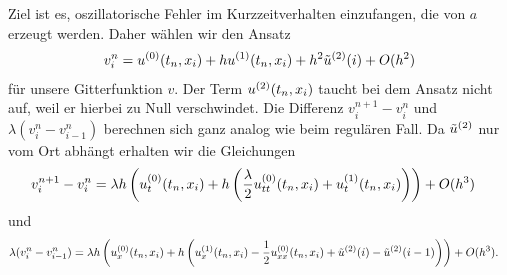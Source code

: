Ziel ist es, oszillatorische Fehler im Kurzzeitverhalten einzufangen, die von $a$ erzeugt werden.
Daher wählen wir den Ansatz
\begin{align}\label{eq:varadv:ansatz}
v^n_i = u^{(0)}(t_n, x_i) + h u^{(1)}(t_n, x_i) + h^2 \tilde u^{(2)}(i) + O(h^2)
\end{align}
für unsere Gitterfunktion $v$. 
Der Term $u^{(2)}(t_n, x_i)$ taucht bei dem Ansatz nicht auf, weil er hierbei zu Null verschwindet.
Die Differenz $v^{n+1}_i - v^n_i$ und $\lambda (v^n_{i} - v^n_{i-1})$ berechnen sich ganz analog wie beim regulären Fall.
Da $\tilde u^{(2)}$ nur vom Ort abhängt erhalten wir die Gleichungen
\begin{align*}
v^{n+1}_i - v^n_i
&= \lambda h \left( u^{(0)}_t (t_n, x_i) + h \left( \frac \lambda 2 u^{(0)}_{tt}(t_n, x_i) + u^{(1)}_t(t_n, x_i) \right) \right) + O(h^3)
\end{align*}
und
{\small\begin{align*}
\lambda (v^n_{i} - v^n_{i-1})
&= \lambda h \left( u^{(0)}_x(t_n, x_i) + h \left( u^{(1)}_x(t_n, x_i) - \frac 12 u^{(0)}_{xx}(t_n, x_i) + \tilde u^{(2)}(i) - \tilde u^{(2)}(i-1) \right) \right) + O(h^3).
\end{align*}}
